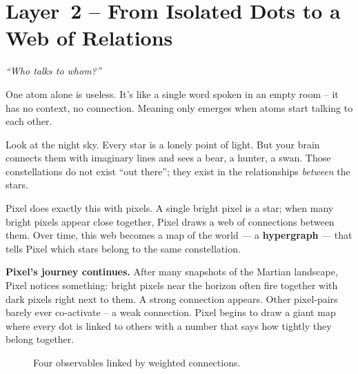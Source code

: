 \section{Layer~2 – From Isolated Dots to a Web of Relations}
\label{sec:layer2}

\begin{tcolorbox}[colback=blue!5, colframe=blue!60, title=\textbf{Superpower: The Networker}]
\begin{center}
\textit{“Who talks to whom?”}
\end{center}
\end{tcolorbox}

One atom alone is useless.  It’s like a single word spoken in an empty
room – it has no context, no connection.  Meaning only emerges when
atoms start talking to each other.

\begin{tcolorbox}[colback=yellow!5, colframe=yellow!80, title=Real‑life analogy]
Look at the night sky.  Every star is a lonely point of light.  But
your brain connects them with imaginary lines and sees a bear, a
hunter, a swan.  Those constellations do not exist “out there”; they
exist in the relationships \emph{between} the stars.

Pixel does exactly this with pixels.  A single bright pixel is a star;
when many bright pixels appear close together, Pixel draws a web of
connections between them.  Over time, this web becomes a map of the
world — a \textbf{hypergraph} — that tells Pixel which stars belong to
the same constellation.
\end{tcolorbox}

\textbf{Pixel’s journey continues.}
After many snapshots of the Martian landscape, Pixel notices something:
bright pixels near the horizon often fire together with dark pixels
right next to them.  A strong connection appears.  Other pixel‑pairs
barely ever co‑activate – a weak connection.  Pixel begins to draw a
giant map where every dot is linked to others with a number that says
how tightly they belong together.

\begin{figure}[ht]
\centering
{}
\caption{Four observables linked by weighted connections.}
\label{fig:network}
\end{figure}

